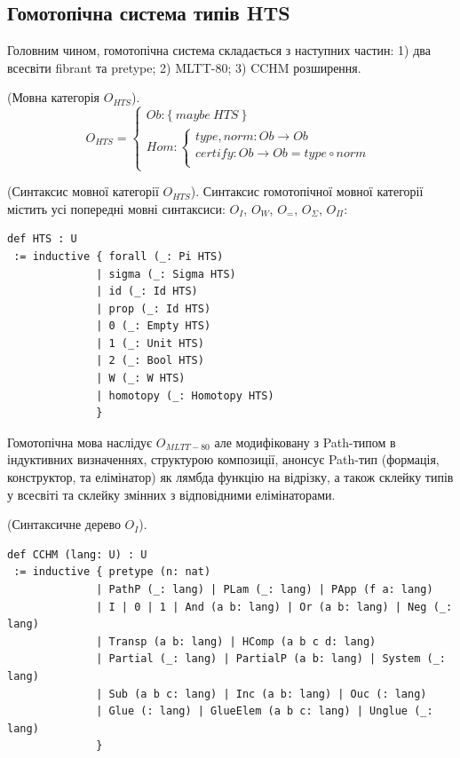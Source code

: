 \newpage
\subsection{Гомотопічна система типів HTS}

Головним чином, гомотопічна система складається з наступних частин:
1) два всесвіти fibrant та pretype; 2) MLTT-80; 3) CCHM розширення.

\begin{definition} (Мовна категорія $O_{HTS}$).
$$
O_{HTS} =
\begin{cases}
Ob: \{\ maybe\ HTS\ \} \\
Hom: \begin{cases}
type,norm: Ob \rightarrow Ob \\
certify: Ob \rightarrow Ob = type \circ norm \\
\end{cases}
\end{cases}
$$
\end{definition}

\begin{definition} (Синтаксис мовної категорії $O_{HTS}$).
Синтаксис гомотопічної мовної категорії містить усі
попередні мовні синтаксиси: $O_I$, $O_W$, $O_=$, $O_\Sigma$, $O_\Pi$:
\begin{lstlisting}[mathescape=true]
def HTS : U
 := inductive { forall (_: Pi HTS)
              | sigma (_: Sigma HTS)
              | id (_: Id HTS)
              | prop (_: Id HTS)
              | 0 (_: Empty HTS)
              | 1 (_: Unit HTS)
              | 2 (_: Bool HTS)
              | W (_: W HTS)
              | homotopy (_: Homotopy HTS)
              }
\end{lstlisting}
\end{definition}

Гомотопічна мова наслідує $O_{MLTT-80}$ але модифіковану з
Path-типом в індуктивних визначеннях, структурою композиції,
анонсує Path-тип (формація, конструктор, та елімінатор)
як лямбда функцію на відрізку, а також склейку типів у всесвіті
та склейку змінних з відповідними елімінаторами.

\begin{definition} (Синтаксичне дерево $O_I$).
\begin{lstlisting}[mathescape=true]
def CCHM (lang: U) : U
 := inductive { pretype (n: nat)
              | PathP (_: lang) | PLam (_: lang) | PApp (f a: lang)
              | I | 0 | 1 | And (a b: lang) | Or (a b: lang) | Neg (_: lang)
              | Transp (a b: lang) | HComp (a b c d: lang)
              | Partial (_: lang) | PartialP (a b: lang) | System (_: lang)
              | Sub (a b c: lang) | Inc (a b: lang) | Ouc (: lang)
              | Glue (: lang) | GlueElem (a b c: lang) | Unglue (_: lang)
              }
\end{lstlisting}
\end{definition}

